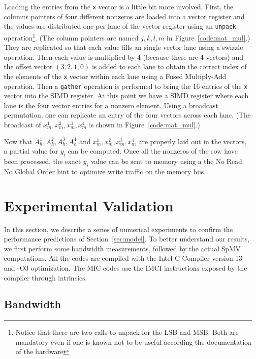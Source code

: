\documentclass[10pt,conference,compsocconf]{IEEEtran}
\begin{document}
Loading the entries from the {\tt x} vector is a little bit more
involved. First, the columns pointers of four different nonzeros are
loaded into a vector register and the values are distributed one per
lane of the vector register using an {\tt unpack}
operation\footnote{Notice that there are two calls to unpack for the
  LSB and MSB. Both are mandatory even if one is known not to be
  useful according the documentation of the hardware}. (The column
pointers are named $j,k,l,m$ in Figure~\ref{code:mat_mul}.) They
are replicated so that each value fills an single vector lane 
using a swizzle operation. Then each value is multiplied by 4 
(because there are 4 vectors) 
and the offset vector $(3,2,1,0)$ is added to each lane to obtain the
correct index of the elements of the {\tt x} vector within each lane
using a Fused Multiply-Add operation. Then a {\tt gather} operation is
performed to bring the 16 entries of the {\tt x} vector into the SIMD
register. At this point we have a SIMD register where each lane is the
four vector entries for a nonzero element. Using a broadcast
permutation, one can replicate an entry of the four vectors across
each lane. (The broadcast of $x_m^1,x_m^2,x_m^3,x_m^4$ is shown in
Figure~\ref{code:mat_mul}.)

Now that $A_h^1,A_h^2,A_h^3,A_h^4$ and $x_m^1,x_m^2,x_m^3,x_m^4$ are
properly laid out in the vectors, a partial value for $y_i$ can be
computed. Once all the nonzeros of the row have been processed, the
exact $y_i$ value can be sent to memory using a the No Read No Global
Order hint to optimize write traffic on the memory bus.


\section{Experimental Validation}
\label{sec:expe}
In this section, we describe a series of numerical experiments to
confirm the performance predictions of Section~\ref{sec:model}. To
better understand our results, we first perform some bandwidth
measurements, followed by the actual SpMV computations. All the codes
are compiled with the Intel C Compiler version 13 and
-O3 optimization. The MIC codes use the IMCI instructions exposed by
the compiler through intrinsics.

\subsection{Bandwidth}
\end{document}
